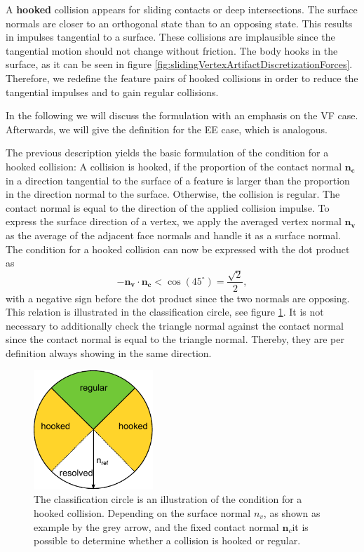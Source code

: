 A \textbf{hooked} collision appears for sliding contacts or deep intersections. The surface normals are closer to an orthogonal state than to an opposing state. This results in impulses tangential to a surface. These collisions are implausible since the tangential motion should not change without friction. The body hooks in the surface, as it can be seen in figure \ref{fig:slidingVertexArtifactDiscretizationForces}.
Therefore, we redefine the feature pairs of hooked collisions in order to reduce the tangential impulses and to gain regular collisions.

In the following we will discuss the formulation with an emphasis on the VF case. Afterwards, we will give the definition for the EE case, which is analogous.

The previous description yields the basic formulation of the condition for a hooked collision:  A collision is hooked, if the proportion of the contact normal  $\mathbf{n_{c}}$ in a direction tangential to the surface of a feature is larger than the proportion in the direction normal to the surface. Otherwise, the collision is regular. The contact normal is equal to the direction of the applied collision impulse. To express the surface direction of a vertex, we apply the averaged vertex normal $\mathbf{n_{v}}$ as the average of the adjacent face normals and handle it as a surface normal. The condition for a hooked collision can now be expressed with the dot product as
\begin{equation}
-\mathbf{n_{v} \cdot n_{c}}<\cos(45^\circ)=\frac{\sqrt 2}{2},
\end{equation}
with a negative sign before the dot product since the two normals are opposing.
This relation is illustrated in the classification circle, see figure
\ref{fig::classification}. It is not necessary to additionally check the triangle normal against the contact normal since the contact normal is equal to the triangle normal. Thereby, they are per definition always showing in the same direction.
\begin{figure}[tbp] 
  \centering
     \includegraphics[width=0.4\textwidth]{pics/pdf/classification.pdf}
  \caption[2D-Illustration of the classification circle.]{The classification circle is an illustration of the condition for a hooked collision. Depending on the surface normal $n_v$, as shown as example by the grey arrow, and the fixed contact normal $\mathbf n_c$it is possible to determine whether a collision is hooked or regular.}
  \label{fig::classification}
\end{figure}

